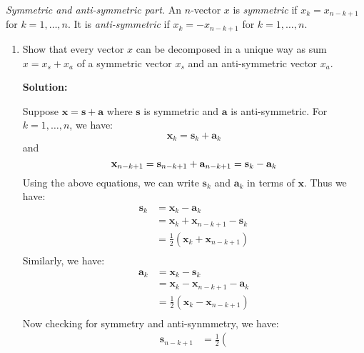 \textit{Symmetric and anti-symmetric part.} An $n$-vector $x$ is
\textit{symmetric} if $x_k = x_{n-k+1}$ for $k = 1, \ldots, n$. It is
\textit{anti-symmetric} if $x_k = -x_{n-k+1}$ for $k = 1, \ldots, n$.
\begin{enumerate}[label=(\alph*)]
	\item Show that every vector $x$ can be decomposed in a unique way as sum $x
		      = x_s + x_a$ of a symmetric vector $x_s$ and an anti-symmetric vector
	      $x_a$.
	      \begin{tcolorbox}
		      \textbf{Solution:} \par
		      Suppose $\mathbf{x} = \mathbf{s} + \mathbf{a}$ where $\mathbf{s}$
		      is symmetric and $\mathbf{a}$ is anti-symmetric. For $k = 1,
			      \ldots, n$, we have:
		      $$
			      \mathbf{x}_k = \mathbf{s}_k + \mathbf{a}_k
		      $$
		      and
		      $$
			      \mathbf{x}_{n - k + 1} = \mathbf{s}_{n - k + 1} +
			      \mathbf{a}_{n - k + 1} = \mathbf{s}_k - \mathbf{a}_k \\
		      $$
		      Using the above equations, we can write $\mathbf{s}_k$ and
		      $\mathbf{a}_k$ in terms of $\mathbf{x}$. Thus we have:
		      $$
			      \begin{aligned}
				      \mathbf{s}_k & = \mathbf{x}_k - \mathbf{a}_k             \\
				                   & = \mathbf{x}_k + \mathbf{x}_{n - k + 1} -
				      \mathbf{s}_k                                             \\
				                   & = \frac{1}{2} \left( \mathbf{x}_k +
				      \mathbf{x}_{n - k + 1} \right)                           \\
			      \end{aligned}
		      $$
		      Similarly, we have:
		      $$
			      \begin{aligned}
				      \mathbf{a}_k & = \mathbf{x}_k - \mathbf{s}_k             \\
				                   & = \mathbf{x}_k - \mathbf{x}_{n - k + 1} -
				      \mathbf{a}_k                                             \\
				                   & = \frac{1}{2} \left( \mathbf{x}_k -
				      \mathbf{x}_{n - k + 1} \right)                           \\
			      \end{aligned}
		      $$
		      Now checking for symmetry and anti-synmmetry, we have:
		      $$
			      \begin{aligned}
				      \mathbf{s}_{n - k + 1} & = \frac{1}{2} \left(

\end{aligned}$$
\end{tcolorbox}
\end{enumerate}
